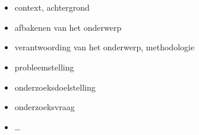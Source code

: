 
\chapter{}%
\label{ch:inleiding}


\begin{itemize}
  \item context, achtergrond
  \item afbakenen van het onderwerp
  \item verantwoording van het onderwerp, methodologie
  \item probleemstelling
  \item onderzoeksdoelstelling
  \item onderzoeksvraag
  \item \ldots
\end{itemize}

\section{}%
\label{sec:probleemstelling}



\let\oldquote\quote
\let\endoldquote\endquote
\renewenvironment{quote}[2][]
{\if\relax\detokenize{#1}\relax
    \def\quoteauthor{#2}%
    \else
    \def\quoteauthor{#2~---~#1}%
    \fi
    \oldquote}
{\par\nobreak\smallskip\hfill(\quoteauthor)%
    \endoldquote\addvspace{\bigskipamount}}

